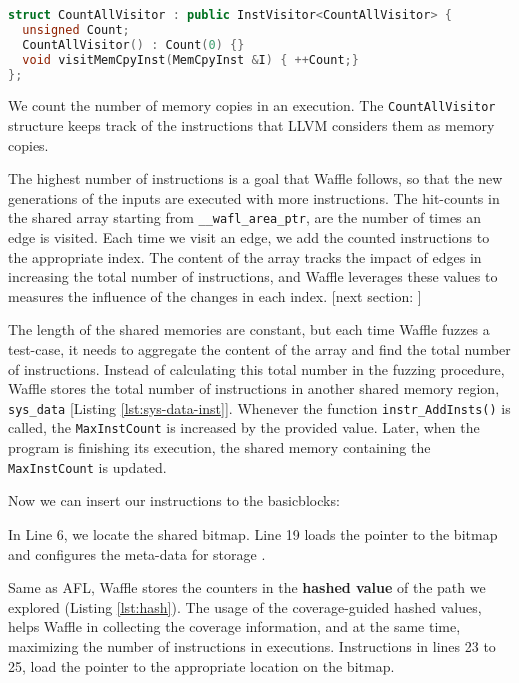 \begin{lstlisting}[language=C++,style=CodeStyle,label={lst:wfl-vis}]
struct CountAllVisitor : public InstVisitor<CountAllVisitor> {
  unsigned Count;
  CountAllVisitor() : Count(0) {}
  void visitMemCpyInst(MemCpyInst &I) { ++Count;}
};
\end{lstlisting}

We count the number of memory copies in an execution. The \texttt{CountAll\-Visitor} structure keeps track of the instructions that LLVM considers them as memory copies.

The highest number of instructions is a goal that Waffle follows, so that the new generations of the inputs are executed with more instructions. The hit-counts in the shared array starting from \texttt{\_\_wafl\_area\_ptr}, are the number of times an edge is visited. Each time we visit an edge, we add the counted instructions to the appropriate index. The content of the array tracks the impact of edges in increasing the total number of instructions, and Waffle leverages these values to measures the influence of the changes in each index. [next section: ]

The length of the shared memories are constant, but each time Waffle fuzzes a test-case, it needs to aggregate the content of the array and find the total number of instructions. Instead of calculating this total number in the fuzzing procedure, Waffle stores the total number of instructions in another shared memory region, \texttt{sys\_data} [Listing \ref{lst:sys-data-inst}]. Whenever the function \texttt{instr\_AddInsts()} is called, the \texttt{MaxInstCount} is increased by the provided value. Later, when the program is finishing its execution, the shared memory containing the \texttt{MaxInstCount} is updated. 



Now we can insert our instructions to the basicblocks:



In Line 6, we locate the shared bitmap. Line 19 loads the pointer to the bitmap and configures the meta-data for storage \cite{nosanitize}.

Same as AFL, Waffle stores the counters in the \textbf{hashed value} of the path we explored (Listing \ref{lst:hash}). The usage of the coverage-guided hashed values, helps Waffle in collecting the coverage information, and at the same time, maximizing the number of instructions in executions. Instructions in lines 23 to 25, load the pointer to the appropriate location on the bitmap.


